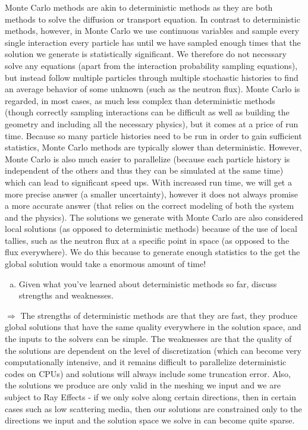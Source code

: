 \documentclass[10pt]{article}
\begin{document}
Monte Carlo methods are akin to deterministic methods as they are both methods to solve the diffusion or transport equation. In contrast to deterministic methods, however, in Monte Carlo we use continuous variables and sample every single interaction every particle has until we have sampled enough times that the solution we generate is statistically significant. We therefore do not necessary solve any equations (apart from the interaction probability sampling equations), but instead follow multiple particles through multiple stochastic histories to find an average behavior of some unknown (such as the neutron flux). Monte Carlo is regarded, in most cases, as much less complex than deterministic methods (though correctly sampling interactions can be difficult as well as building the geometry and including all the necessary physics), but it comes at a price of run time. Because so many particle histories need to be run in order to gain sufficient statistics, Monte Carlo methods are typically slower than deterministic. However, Monte Carlo is also much easier to parallelize (because each particle history is independent of the others and thus they can be simulated at the same time) which can lead to significant speed ups. With increased run time, we will get a more precise answer (a smaller uncertainty), however it does not always promise a more accurate answer (that relies on the correct modeling of both the system and the physics). The solutions we generate with Monte Carlo are also considered local solutions (as opposed to deterministic methods) because of the use of local tallies, such as the neutron flux at a specific point in space (as opposed to the flux everywhere). We do this because to generate enough statistics to the get the global solution would take a enormous amount of time!\\




\begin{enumerate}[(b)]
    \item Given what you've learned about deterministic methods so far, discuss strengths and weaknesses.\\[-5pt]
\end{enumerate}

$\Rightarrow$ The strengths of deterministic methods are that they are fast, they produce global solutions that have the same quality everywhere in the solution space, and the inputs to the solvers can be simple. The weaknesses are that the quality of the solutions are dependent on the level of discretization (which can become very computationally intensive, and it remains difficult to parallelize deterministic codes on CPUs) and solutions will always include some truncation error. Also, the solutions we produce are only valid in the meshing we input and we are subject to Ray Effects - if we only solve along certain directions, then in certain cases such as low scattering media, then our solutions are constrained only to the directions we input and the solution space we solve in can become quite sparse.
\end{document}
